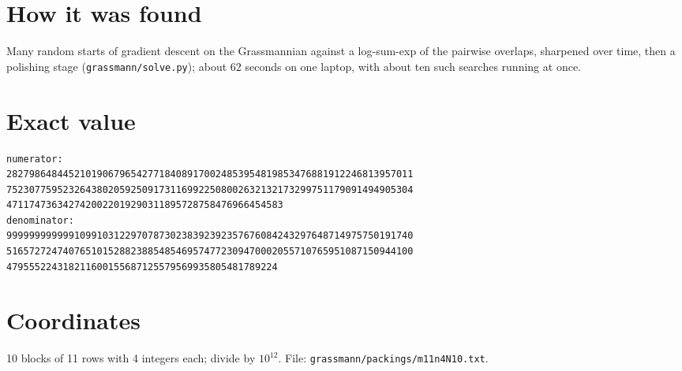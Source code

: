 \documentclass[11pt,a4paper]{article}
\begin{document}
\section{How it was found}
Many random starts of gradient descent on the Grassmannian against a log-sum-exp of the pairwise overlaps, sharpened over time, then a polishing stage (\texttt{grassmann/solve.py}); about 62 seconds on one laptop, with about ten such searches running at once.


\appendix
\section{Exact value}
{\small
\begin{verbatim}
numerator:
282798648445210190679654277184089170024853954819853476881912246813957011
752307759523264380205925091731169922508002632132173299751179091494905304
4711747363427420022019290311895728758476966454583
denominator:
999999999999109910312297078730238392392357676084243297648714975750191740
516572724740765101528823885485469574772309470002055710765951087150944100
479555224318211600155687125579569935805481789224
\end{verbatim}}

\section{Coordinates}
10 blocks of 11 rows with 4 integers each; divide by $10^{12}$. File: \texttt{grassmann/packings/m11n4N10.txt}.
{\tiny
\begin{multicols}{3}
\end{multicols}}
\end{document}
